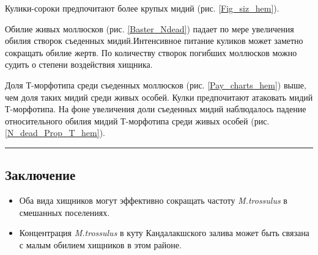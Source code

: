 \documentclass[20pt,a0,portrait]{a0poster}
\begin{document}
\begin{minipage}[t]{0.5\linewidth}
\begin{minipage}[t]{0.46\linewidth}
\begin{center}
			\label{N_dead_Prop_T_hem}
		\end{center}
\end{minipage}\vspace{0.5cm}


\vspace{\belowdisplayskip}
Кулики-сороки предпочитают более крупых мидий (рис. \ref{Fig_siz_hem}).

Обилие живых моллюсков (рис. \ref{Baster_Ndead}) падает по мере увеличения обилия створок съеденных мидий.Интенсивное питание куликов может заметно сокращать обилие жертв. По количеству створок погибших моллюсков можно судить о степени воздействия хищника.

Доля Т-морфотипа среди съеденных моллюсков (рис.  \ref{Pay_charts_hem}) выше, чем доля таких мидий среди живых особей. Кулки предпочитают атаковать мидий Т-морфотипа. 
На фоне увеличения доли съеденных мидий наблюдалось падение относительного обилия мидий Т-морфотипа среди живых особей (рис. \ref{N_dead_Prop_T_hem}).

\end{minipage}





%
%

		\color{SaddleBrown} %

\vspace{0.4cm}

\rule{0.5\linewidth}{4pt}

\begin{minipage}[t][4cm][t]{\textwidth}
		\subsection*{Заключение}

		\begin{itemize}
			\item Оба вида хищников могут эффективно сокращать частоту \emph{M.trossulus} в смешанных поселениях.
			\item Концентрация \emph{M.trossulus} в куту Кандалакшского залива может быть связана с малым обилием хищников в этом районе.
		\end{itemize}

		\color{DarkSlateGray} %
\end{minipage}
\end{document}
